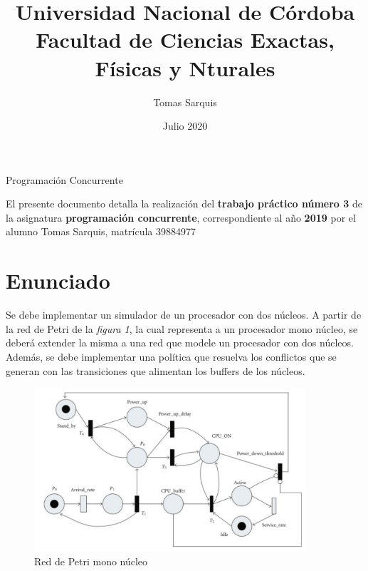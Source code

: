 \documentclass{article}
\title{Universidad Nacional de Córdoba\\Facultad de Ciencias Exactas, Físicas y Nturales}
\author{Tomas Sarquis}
\date{Julio 2020}
\begin{document}
    \begin{titlingpage}
        \maketitle
        \null \null \null \null
        \begin{center}
            {\huge Programación Concurrente}
        \end{center}
        \vspace*{\fill}
        El presente documento detalla la realización del \textbf{trabajo práctico número 3} 
        de la asignatura \textbf{programación concurrente}, correspondiente al año \textbf{2019}
        por el alumno Tomas Sarquis, matrícula 39884977
        \vspace*{\fill}
    \end{titlingpage}
    \section{Enunciado}
    \begin{flushleft}
        Se debe implementar un simulador de un procesador con dos núcleos. A partir de la red de
        Petri de la \emph{figura 1}, la cual representa a un procesador mono núcleo, se deberá 
        extender la misma a una red que modele un procesador con dos núcleos. Además, se debe
        implementar una política que resuelva los conflictos que se generan con las transiciones
        que alimentan los buffers de los núcleos.
    \end{flushleft}
    \begin{figure}[h]
        \includegraphics[width=0.9\textwidth, center]{rdp_enun.png}
        \caption{Red de Petri mono núcleo}
    \end{figure} \newpage
\end{document}
